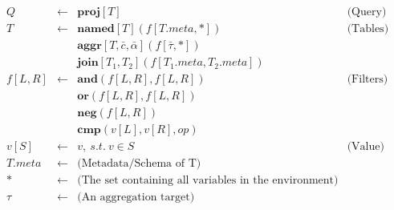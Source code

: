 \documentclass[letter, notitlepage]{article}
\begin{document}
\[
\begin{array}{rcll}
	Q 		 & \leftarrow & \mathbf{proj}[T] & \text{(Query)}\\
	T 		 & \leftarrow & \mathbf{named}[T](f[T.\mathit{meta}, *]) & \text{(Tables)}\\
				 & 						& \mathbf{aggr}[T,\bar{c},\bar{\alpha}](f[\bar\tau, *])\\
				 & 						& \mathbf{join}[T_1, T_2](f[T_1.\mathit{meta}, T_2.\mathit{meta}])\\
	f[L,R] & \leftarrow & \mathbf{and}(f[L,R],f[L,R]) & \text{(Filters)}\\
				 & 						& \mathbf{or}(f[L,R],f[L,R])\\
				 & 						& \mathbf{neg}(f[L,R])\\
				 & 						& \mathbf{cmp}(v[L], v[R], \mathit{op})\\
	v[S] 	 & \leftarrow & v,~s.t.~v\in S & \text{(Value)}\\
	T.\mathit{meta} & \leftarrow & \text{(Metadata/Schema of T)}\\
	* & \leftarrow & \text{(The set containing all variables in the environment)}\\
	\tau & \leftarrow & \text{(An aggregation target)}
\end{array}
\]
\end{document}
